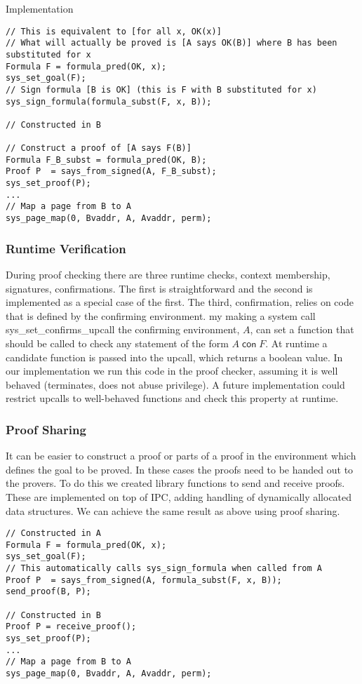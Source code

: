 \documentclass[10pt]{article}
\newcommand{\confirms}[2]{\ensuremath{#1\;\textsf{con}\;#2}}
\begin{document}
\begin{section}{Implementation}
\begin{lstlisting}
// This is equivalent to [for all x, OK(x)]
// What will actually be proved is [A says OK(B)] where B has been substituted for x
Formula F = formula_pred(OK, x);
sys_set_goal(F);
// Sign formula [B is OK] (this is F with B substituted for x)
sys_sign_formula(formula_subst(F, x, B));

// Constructed in B

// Construct a proof of [A says F(B)]
Formula F_B_subst = formula_pred(OK, B);
Proof P  = says_from_signed(A, F_B_subst);
sys_set_proof(P);
...
// Map a page from B to A
sys_page_map(0, Bvaddr, A, Avaddr, perm);
\end{lstlisting}
\subsubsection{Runtime Verification}
During proof checking there are three runtime checks, context membership, signatures, confirmations.  The first is straightforward and the second is implemented as a special case of the first.  The third, confirmation, relies on code that is defined by the confirming environment.  my making a system call \textsf{sys\_set\_confirms\_upcall} the confirming environment, $A$, can set a function that should be called to check any statement of the form $\confirms{A}{F}$.  At runtime a candidate function is passed into the upcall, which returns a boolean value.  In our implementation we run this code in the proof checker, assuming it is well behaved (terminates, does not abuse privilege).  A future implementation could restrict upcalls to well-behaved functions and check this property at runtime.
\subsubsection{Proof Sharing}
It can be easier to construct a proof or parts of a proof in the environment which defines the goal to be proved.  In these cases the proofs need to be handed out to the provers.  To do this we created library functions to send and receive proofs.  These are implemented on top of IPC, adding handling of dynamically allocated data structures.  We can achieve the same result as above using proof sharing.
\begin{lstlisting}
// Constructed in A
Formula F = formula_pred(OK, x);
sys_set_goal(F);
// This automatically calls sys_sign_formula when called from A
Proof P  = says_from_signed(A, formula_subst(F, x, B));
send_proof(B, P);

// Constructed in B
Proof P = receive_proof();
sys_set_proof(P);
...
// Map a page from B to A
sys_page_map(0, Bvaddr, A, Avaddr, perm);
\end{lstlisting}
\end{section}
\end{document}
